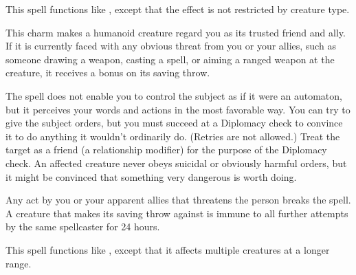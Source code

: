 \begin{spelleffect}
  This spell functions like , except that the effect is not restricted by creature type.
\end{spelleffect}

\spellrng{\rngmed}
\spelldur{\durlong}
\begin{spelleffect}
  This charm makes a humanoid creature regard you as its trusted friend and ally. If it is currently faced with any obvious threat from you or your allies, such as someone drawing a weapon, casting a spell, or aiming a ranged weapon at the creature, it receives a  bonus on its saving throw.
  \par The spell does not enable you to control the subject as if it were an automaton, but it perceives your words and actions in the most favorable way. You can try to give the subject orders, but you must succeed at a Diplomacy check to convince it to do anything it wouldn't ordinarily do. (Retries are not allowed.) Treat the target as a friend (a  relationship modifier) for the purpose of the Diplomacy check. An affected creature never obeys suicidal or obviously harmful orders, but it might be convinced that something very dangerous is worth doing.
\end{spelleffect}
\begin{spellnotes}
  Any act by you or your apparent allies that threatens the  person breaks the spell. A creature that makes its saving throw against  is immune to all further attempts by the same spellcaster for 24 hours.
\end{spellnotes}

\begin{spelleffect}
  This spell functions like , except that it affects multiple creatures at a longer range.
\end{spelleffect}

